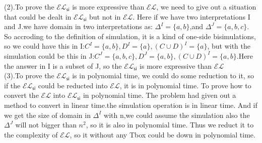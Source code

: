 \documentclass{article}
\begin{document}
    (2).To prove the $\mathcal{EL}_\textsf{si}$ is more expressive than $\mathcal{EL}$, we need to give out a situation that could be dealt in $\mathcal{EL}_\textsf{si}$ but not in  $\mathcal{EL}$. Here if we have two interpretations I and J.we have domain in two interpretations as:
    $\Delta^I = \{a,b\}$,and $\Delta^J = \{a,b,c\}$. So accroding to the definition of simulation, it is a kind of one-side bisimulations, so we could have this in I:$C^I=\{a,b\},D^I = \{a\},(C\cup D)^I = \{a\}$, but with the simulation could be this in J:$C^J=\{a,b,c\},D^J = \{a,b\},(C\cup D)^I = \{a,b\}$.Here
    the answer in I is a subset of J, so the $\mathcal{EL}_\textsf{si}$ is more expressive than $\mathcal{EL}$\\
    
    (3).To prove the $\mathcal{EL}_\textsf{si}$  is in polynomial time, we could do some reduction to it, so if the $\mathcal{EL}_\textsf{si}$ could be reducted into $\mathcal{EL}$, it is in polynomial time.
    To prove how to convert the $\mathcal{EL}$ into $\mathcal{EL}_\textsf{si}$  in polynomial time. The problem had given out a method to convert in linear time.the simulation operation is in linear time. And if we get the size of domain in
    $\Delta^I$ with n,we could assume the simulation also the $\Delta^J$ will not bigger than $n^2$, so it is also in polynomial time. Thus we reduct it to the complexity of $\mathcal{EL}$, so it without any Tbox could be down in polynomial time. 
\end{document}
